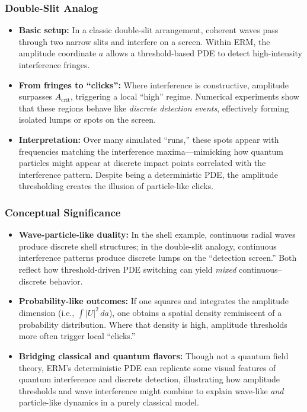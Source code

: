 \documentclass[12pt]{article}
\begin{document}
\subsubsection{Double-Slit Analog}
\begin{itemize}
    \item \textbf{Basic setup:}
    In a classic double-slit arrangement, coherent waves pass through two narrow
    slits and interfere on a screen. Within ERM, the amplitude coordinate $a$
    allows a threshold-based PDE to detect high-intensity interference fringes.
    \item \textbf{From fringes to “clicks”:}
    Where interference is constructive, amplitude surpasses $A_{\mathrm{crit}}$,
    triggering a local “high” regime. Numerical experiments show that these
    regions behave like \emph{discrete detection events}, effectively forming
    isolated lumps or spots on the screen.
    \item \textbf{Interpretation:}
    Over many simulated “runs,” these spots appear with frequencies matching the
    interference maxima—mimicking how quantum particles might appear at discrete
    impact points correlated with the interference pattern. Despite being a
    deterministic PDE, the amplitude thresholding creates the illusion of
    particle-like clicks.
\end{itemize}

\subsubsection{Conceptual Significance}
\begin{itemize}
    \item \textbf{Wave-particle-like duality:} 
    In the shell example, continuous radial waves produce discrete shell structures; 
    in the double-slit analogy, continuous interference patterns produce discrete 
    lumps on the “detection screen.” Both reflect how threshold-driven PDE switching 
    can yield \emph{mixed} continuous–discrete behavior.
    \item \textbf{Probability-like outcomes:}
    If one squares and integrates the amplitude dimension (i.e., $\int |U|^2 \,da$), 
    one obtains a spatial density reminiscent of a probability distribution. Where 
    that density is high, amplitude thresholds more often trigger local “clicks.”
    \item \textbf{Bridging classical and quantum flavors:}
    Though not a quantum field theory, ERM’s deterministic PDE can replicate some 
    visual features of quantum interference and discrete detection, illustrating 
    how amplitude thresholds and wave interference might combine to explain 
    wave-like \emph{and} particle-like dynamics in a purely classical model.
\end{itemize}
\end{document}
